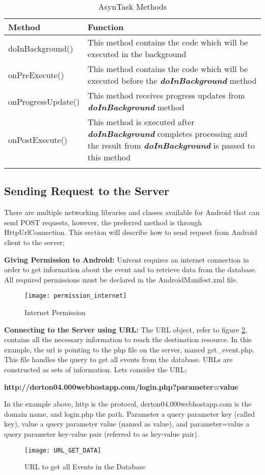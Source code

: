  
\begin{longtable}{| L{5cm} | L{9cm} |}
	Method  & Function  \\ \hline
doInBackground() & This method contains the code which will be executed in the background\\	\hline
	onPreExecute() &	This method contains the code which will be executed before the \textbf{\textit{doInBackground}} method\\	\hline
onProgressUpdate()   &This method receives progress updates from \textbf{\textit{doInBackground}} method\\	\hline
onPostExecute()  &	 This method is executed after \textbf{\textit{doInBackground}} completes processing and the result from \textbf{\textit{doInBackground}} is passed to this method\\	\hline
	\caption{AsynTask Methods}
	\label{methods}
\end{longtable}
\pagebreak
\subsection{Sending Request to the Server}
There are multiple networking libraries and classes available for Android that can send POST requests, however, the preferred method is through HttpUrlConnection.
This section will describe how to send request from Android client to the server;

\textbf{Giving Permission to Android:}
Univent requires an internet connection in order to get information about the event and to retrieve data from the database. All required permissions must be declared in the AndroidManifest.xml file.
\begin{figure}[h!]
	\centering       
	\texttt{[image: permission\_internet]}
	\caption{Internet Permission}
	\label{fig:internet_permission}	
\end{figure} 

\textbf{Connecting to the Server using URL:} The URL object, refer to figure \ref{fig:urlObject}, contains all the necessary information to reach the destination resource. In this example, the url is pointing to the php file on the server, named get\_event.php. This file handles the query to get all events from the database.
URLs are constructed as sets of information. Lets consider the URL:
\begin{center}
\textbf{ http://derton04.000webhostapp.com/login.php?parameter=value}
\end{center}

In the example above, http is the protocol, derton04.000webhostapp.com is the domain name, and login.php the path. Parameter a query parameter key (called key), value a query parameter value (named as value), and parameter=value a query parameter key-value pair (referred to as key-value pair).
\begin{figure}[h!]
	\centering       
	\texttt{[image: URL\_GET\_DATA]}
	\caption{URL to get all Events in the Database}
	\label{fig:urlObject}	
\end{figure} 
 
